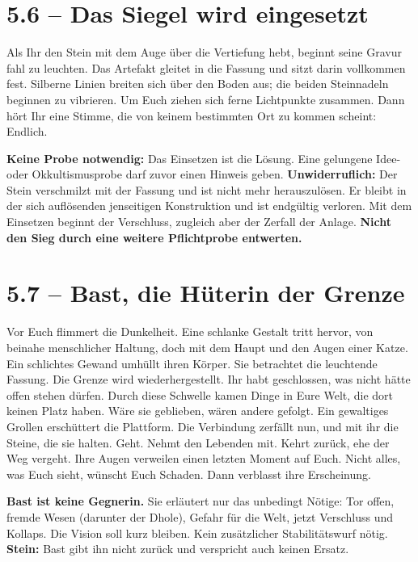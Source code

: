 \section{5.6 -- Das Siegel wird eingesetzt}
\begin{vorlesetextalle}
Als Ihr den Stein mit dem Auge über die Vertiefung hebt, beginnt seine Gravur fahl zu leuchten. Das Artefakt gleitet in die Fassung und sitzt darin vollkommen fest. Silberne Linien breiten sich über den Boden aus; die beiden Steinnadeln beginnen zu vibrieren. Um Euch ziehen sich ferne Lichtpunkte zusammen. Dann hört Ihr eine Stimme, die von keinem bestimmten Ort zu kommen scheint: \glqq{}Endlich.\grqq{}
\end{vorlesetextalle}
\begin{meisterinfo}
\textbf{Keine Probe notwendig:} Das Einsetzen ist die Lösung. Eine gelungene Idee- oder Okkultismusprobe darf zuvor einen Hinweis geben. \textbf{Unwiderruflich:} Der Stein verschmilzt mit der Fassung und ist nicht mehr herauszulösen. Er bleibt in der sich auflösenden jenseitigen Konstruktion und ist endgültig verloren. Mit dem Einsetzen beginnt der Verschluss, zugleich aber der Zerfall der Anlage. \textbf{Nicht den Sieg durch eine weitere Pflichtprobe entwerten.}
\end{meisterinfo}

\section{5.7 -- Bast, die Hüterin der Grenze}
\begin{vorlesetextalle}
Vor Euch flimmert die Dunkelheit. Eine schlanke Gestalt tritt hervor, von beinahe menschlicher Haltung, doch mit dem Haupt und den Augen einer Katze. Ein schlichtes Gewand umhüllt ihren Körper. Sie betrachtet die leuchtende Fassung. \glqq{}Die Grenze wird wiederhergestellt. Ihr habt geschlossen, was nicht hätte offen stehen dürfen. Durch diese Schwelle kamen Dinge in Eure Welt, die dort keinen Platz haben. Wäre sie geblieben, wären andere gefolgt.\grqq{} Ein gewaltiges Grollen erschüttert die Plattform. \glqq{}Die Verbindung zerfällt nun, und mit ihr die Steine, die sie halten. Geht. Nehmt den Lebenden mit. Kehrt zurück, ehe der Weg vergeht.\grqq{} Ihre Augen verweilen einen letzten Moment auf Euch. \glqq{}Nicht alles, was Euch sieht, wünscht Euch Schaden.\grqq{} Dann verblasst ihre Erscheinung.
\end{vorlesetextalle}
\begin{meisterinfo}
\textbf{Bast ist keine Gegnerin.} Sie erläutert nur das unbedingt Nötige: Tor offen, fremde Wesen (darunter der Dhole), Gefahr für die Welt, jetzt Verschluss und Kollaps. Die Vision soll kurz bleiben. Kein zusätzlicher Stabilitätswurf nötig. \textbf{Stein:} Bast gibt ihn nicht zurück und verspricht auch keinen Ersatz.
\end{meisterinfo}

